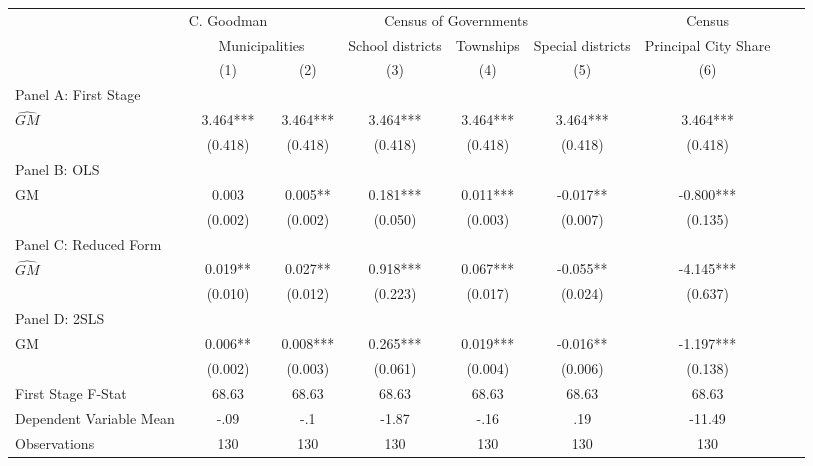  \begin{tabular}{l*{8}{c}} \toprule
&\multicolumn{1}{c}{C. Goodman}&\multicolumn{4}{c}{Census of Governments}&\multicolumn{1}{c}{Census}\\\cmidrule(lr){2-2}\cmidrule(lr){3-6}\cmidrule(lr){7-7}
&\multicolumn{2}{c}{Municipalities}&\multicolumn{1}{c}{School districts}&\multicolumn{1}{c}{Townships}&\multicolumn{1}{c}{Special districts}&\multicolumn{1}{c}{Principal City Share}\\\cmidrule(lr){2-3}\cmidrule(lr){4-6}\cmidrule(lr){7-7}
&\multicolumn{1}{c}{(1)}&\multicolumn{1}{c}{(2)}&\multicolumn{1}{c}{(3)}&\multicolumn{1}{c}{(4)}&\multicolumn{1}{c}{(5)}&\multicolumn{1}{c}{(6)}\\
\cmidrule(lr){1-7}
\multicolumn{6}{l}{Panel A: First Stage}\\
\cmidrule(lr){1-7}
$\widehat{GM}$  &    3.464***&    3.464***&    3.464***&    3.464***&    3.464***&    3.464***\\
                &  (0.418)   &  (0.418)   &  (0.418)   &  (0.418)   &  (0.418)   &  (0.418)   \\
\cmidrule(lr){1-7}
\multicolumn{6}{l}{Panel B: OLS}\\
\cmidrule(lr){1-7}
GM              &    0.003   &    0.005** &    0.181***&    0.011***&   -0.017** &   -0.800***\\
                &  (0.002)   &  (0.002)   &  (0.050)   &  (0.003)   &  (0.007)   &  (0.135)   \\
\cmidrule(lr){1-7}
\multicolumn{6}{l}{Panel C: Reduced Form}\\
\cmidrule(lr){1-7}
$\widehat{GM}$  &    0.019** &    0.027** &    0.918***&    0.067***&   -0.055** &   -4.145***\\
                &  (0.010)   &  (0.012)   &  (0.223)   &  (0.017)   &  (0.024)   &  (0.637)   \\
\cmidrule(lr){1-7}
\multicolumn{6}{l}{Panel D: 2SLS}\\
\cmidrule(lr){1-7}
GM              &    0.006** &    0.008***&    0.265***&    0.019***&   -0.016** &   -1.197***\\
                &  (0.002)   &  (0.003)   &  (0.061)   &  (0.004)   &  (0.006)   &  (0.138)   \\
\midrule
First Stage F-Stat&    68.63   &    68.63   &    68.63   &    68.63   &    68.63   &    68.63   \\
Dependent Variable Mean&     -.09   &      -.1   &    -1.87   &     -.16   &      .19   &   -11.49   \\
Observations    &      130   &      130   &      130   &      130   &      130   &      130   \\
       \bottomrule \end{tabular}
